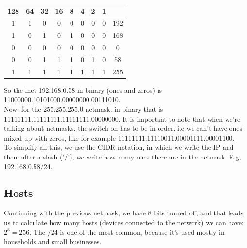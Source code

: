 \documentclass[11pt,a4paper]{article}
\begin{document}
\begin{table}[h]
\centering
\begin{tabular}{|c|c|c|c|c|c|c|c||c|}
\hline 
\textbf{128} & \textbf{64} & \textbf{32} & \textbf{16} & \textbf{8} & \textbf{4} & \textbf{2} & \textbf{1} &  \\ 
\hline 
1 & 1 & 0 & 0 & 0 & 0 & 0 & 0 & 192 \\
\hline
1&0&1&0&1&0&0&0&168\\
\hline 
0 & 0 & 0 & 0 & 0 & 0 & 0 & 0 & 0 \\ 
\hline
0&0&1&1&1&0&1&0&58\\
\hline 
1 & 1 & 1 & 1 & 1 & 1 & 1 & 1 & 255 \\
\hline 
\end{tabular} 
\end{table}
So the inet 192.168.0.58 in binary (ones and zeros) is 11000000.10101000.00000000.00111010.\\

Now, for the 255.255.255.0 netmask: in binary that is 11111111.11111111.11111111.00000000. It is important to note that when we're talking about netmasks, the switch on has to be in order. i.e we can't have ones mixed up with zeros, like for example 11111111.11110011.00001111.00001100.\\

To simplify all this, we use the CIDR notation, in which we write the IP and then, after a slash ('/'), we write how many ones there are in the netmask. E.g, 192.168.0.58/24. 

\subsection{Hosts}
Continuing with the previous netmask, we have 8 bits turned off, and that leads us to calculate how many hosts (devices connected to the network) we can have: $2^8 = 256$. The /24 is one of the most common, because it's used mostly in households and small businesses.
\end{document}
